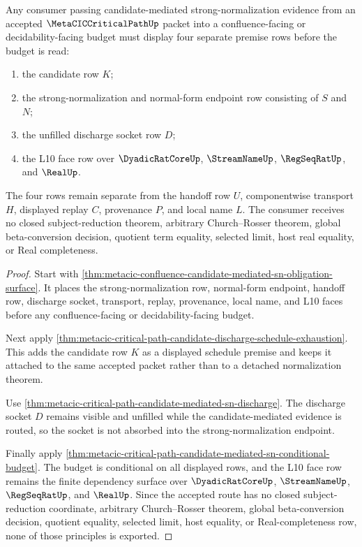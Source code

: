 \begin{theorem}
\label{thm:metacic-criticalpath-candidate-mediated-sn-premise-split}
Any consumer passing candidate-mediated strong-normalization evidence from an accepted $\MetaCICCriticalPathUp$ packet into a confluence-facing or decidability-facing budget must display four separate premise rows before the budget is read:
\begin{enumerate}
\item the candidate row $K$;
\item the strong-normalization and normal-form endpoint row consisting of $S$ and $N$;
\item the unfilled discharge socket row $D$;
\item the L10 face row over $\DyadicRatCoreUp$, $\StreamNameUp$, $\RegSeqRatUp$, and $\RealUp$.
\end{enumerate}
The four rows remain separate from the handoff row $U$, componentwise transport $H$, displayed replay $C$, provenance $P$, and local name $L$. The consumer receives no closed subject-reduction theorem, arbitrary Church--Rosser theorem, global beta-conversion decision, quotient term equality, selected limit, host real equality, or Real completeness.
\end{theorem}
\begin{proof}
Start with \autoref{thm:metacic-confluence-candidate-mediated-sn-obligation-surface}. It places the strong-normalization row, normal-form endpoint, handoff row, discharge socket, transport, replay, provenance, local name, and L10 faces before any confluence-facing or decidability-facing budget.

Next apply \autoref{thm:metacic-critical-path-candidate-discharge-schedule-exhaustion}. This adds the candidate row $K$ as a displayed schedule premise and keeps it attached to the same accepted packet rather than to a detached normalization theorem.

Use \autoref{thm:metacic-critical-path-candidate-mediated-sn-discharge}. The discharge socket $D$ remains visible and unfilled while the candidate-mediated evidence is routed, so the socket is not absorbed into the strong-normalization endpoint.

Finally apply \autoref{thm:metacic-critical-path-candidate-mediated-sn-conditional-budget}. The budget is conditional on all displayed rows, and the L10 face row remains the finite dependency surface over $\DyadicRatCoreUp$, $\StreamNameUp$, $\RegSeqRatUp$, and $\RealUp$. Since the accepted route has no closed subject-reduction coordinate, arbitrary Church--Rosser theorem, global beta-conversion decision, quotient equality, selected limit, host equality, or Real-completeness row, none of those principles is exported.
\end{proof}

